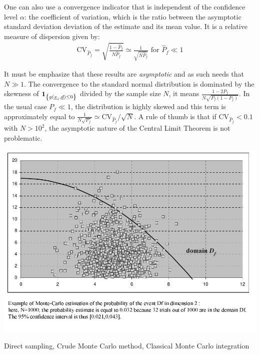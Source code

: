 {  One can also use a convergence indicator that is independent of the confidence level $\alpha$: the coefficient of variation, which is the ratio between the asymptotic standard deviation deviation of the estimate and its mean value. It is a relative measure of dispersion given by:
  \begin{align*}
    \textrm{CV}_{\widehat{P}_f}=\sqrt{ \frac{1-\widehat{P}_f}{N \widehat{P}_f}}\simeq\frac{1}{\sqrt{N\widehat{P}_f}}\mbox{ for }\widehat{P}_f\ll 1
  \end{align*}


  It must be emphasize that these results are \emph{asymptotic} and as such needs that $N\gg 1$. The convergence to the standard normal distribution is dominated by the skewness of $\mathbf{1}_{ \left\{ g({\underline{x}}_i,{\underline{d}}) \leq 0 \right\} }$ divided by the sample size $N$, it means $\frac{1-2P_f}{N\sqrt{P_f(1-P_f)}}$. In the usual case $P_f\ll 1$, the distribution is highly skewed and this term is approximately equal to $\frac{1}{N\sqrt{P_f}}\simeq\textrm{CV}_{\widehat{P}_f}/\sqrt{N}$. A rule of thumb is that if $\textrm{CV}_{\widehat{P}_f}<0.1$ with $N>10^2$, the asymptotic nature of the Central Limit Theorem is not problematic.

  \begin{center}
    \includegraphics[scale=0.8]{Figures/MC2.pdf}
  \end{center}
}
{
  Direct sampling, Crude Monte Carlo method, Classical Monte Carlo integration
}

